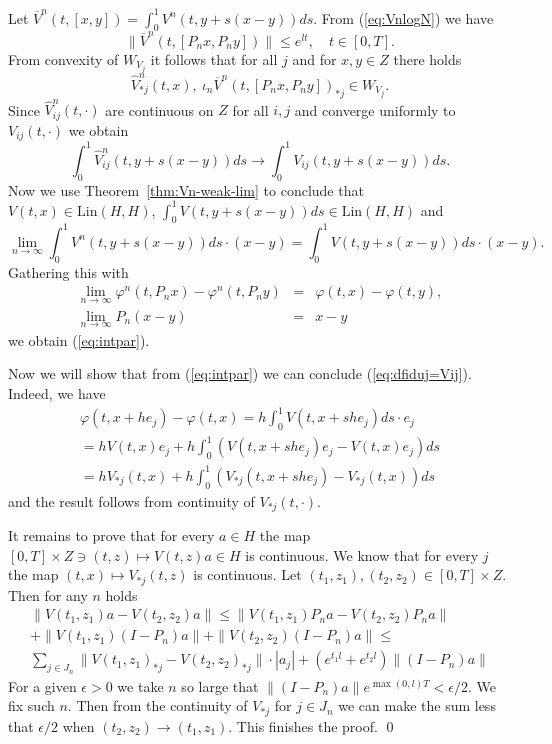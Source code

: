 Let $\overline{V}^n(t,[x,y])=\int^1_0 V^n(t,y+s(x- y))ds$.  From (\ref{eq:VnlogN})  we have
\begin{equation*}
     \|\overline{V}^n(t,[P_nx,P_ny])\| \leq e^{lt}, \quad t\in [0,T].
\end{equation*}
From convexity of $W_{V_j}$ it follows that for all $j$ and for $x,y \in Z$ there holds
\begin{equation*}
  \widehat V_{\ast j}^n(t,x),\ \iota_n \overline{V}^n(t,[P_nx,P_ny])_{\ast j} \in W_{V_j}.
\end{equation*}
Since $\widehat V^n_{ij}(t,\cdot)$ are continuous on $Z$ for all $i,j$ and converge uniformly to $V_{ij}(t,\cdot)$ we obtain
\begin{equation*}
  \int^1_0 \widehat V^n_{ij}(t,y+s(x- y))ds \to \int^1_0 V_{ij}(t,y+s(x- y))ds.
\end{equation*}
Now we use Theorem~\ref{thm:Vn-weak-lim} to conclude that $V(t,x) \in \mbox{Lin}(H,H)$, $\int^1_0 V(t,y+s(x- y))ds \in \mbox{Lin}(H,H)$ and
\begin{equation*}
  \lim_{n \to \infty} \int^1_0 V^n(t,y+s(x- y))ds \cdot (x-y) = \int^1_0 V(t,y+s(x- y))ds \cdot (x-y).
\end{equation*}
Gathering this with
\begin{eqnarray*}
\lim_{n\to\infty}  \varphi^n(t,P_n x) -  \varphi^n(t,P_n y)&=&\varphi(t,x) - \varphi(t,y),\\
\lim_{n\to\infty} P_n (x-y)&=& x-y
\end{eqnarray*}
we obtain (\ref{eq:intpar}).

Now we will show that from (\ref{eq:intpar}) we can conclude (\ref{eq:dfiduj=Vij}). Indeed, we have
\begin{eqnarray*}
  \varphi(t,x+he_j) -  \varphi(t,x) = h \int_0^1 V(t,x+she_j)ds \cdot e_j \\
  = h  V(t,x)e_j + h \int_0^1 \left( V(t,x+she_j)e_j - V(t,x)e_j \right)ds\\
  = h  V_{\ast j}(t,x) + h \int_0^1 \left( V_{\ast j}(t,x+she_j) - V_{\ast j}(t,x) \right)ds
\end{eqnarray*}
and the result follows from continuity of $V_{\ast j}(t,\cdot)$.

It remains to prove that for every $a \in H$ the map $[0,T] \times Z \ni (t,z) \mapsto V(t,z)a \in H$ is continuous. We know that for every $j$ the map $(t,x) \mapsto V_{\ast j}(t,z)$ is continuous. Let $(t_1,z_1), (t_2,z_2) \in [0,T] \times Z$. Then  for any $n$ holds
\begin{eqnarray*}
  \| V(t_1,z_1)a - V(t_2,z_2)a \| \leq \| V(t_1,z_1)P_n a - V(t_2,z_2)P_n a \| \\
   +  \| V(t_1,z_1)(I-P_n) a \| + \| V(t_2,z_2)(I-P_n) a \| \leq  \\
       \sum_{j \in J_n} \|V(t_1,z_1)_{\ast j} - V(t_2,z_2)_{\ast j}\| \cdot |a_j| + (e^{t_1 l} + e^{t_2 l}) \|(I-P_n)a\|
\end{eqnarray*}
For a given $\epsilon>0$ we take $n$ so large that $ \|(I-P_n)a\|e^{\max(0,l)T} < \epsilon/2$. We fix such $n$. Then from the continuity of $V_{\ast j}$ for $j\in J_n$
we can make the sum less that $\epsilon/2$ when $(t_2,z_2) \to (t_1,z_1)$. This finishes the proof.
\qed

